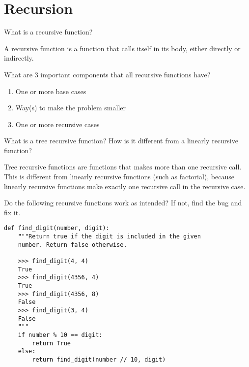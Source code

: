\documentclass{exam}
\begin{document}
\section{Recursion}
\begin{questions}


\begin{blocksection}

\question What is a recursive function?
\begin{solution}[0.5in]
A recursive function is a function that calls itself in its body, either
directly or indirectly.
\end{solution}

\question What are 3 important components that all recursive functions have?
\begin{solution}[1in]
\begin{enumerate}
    \item One or more base cases
    \item Way(s) to make the problem smaller
    \item One or more recursive cases
\end{enumerate}
\end{solution}


\question What is a tree recursive function? How is it different from a linearly
recursive function?
\begin{solution}[0.2in]
Tree recursive functions are functions that makes more than one recursive call.
This is different from linearly recursive functions (such as factorial), because
linearly recursive functions make exactly one recursive call in the recursive
case.
\end{solution}

\end{blocksection}

\begin{blocksection}

\question Do the following recursive functions work as intended? If not, find
the bug and fix it.

\begin{lstlisting}
def find_digit(number, digit):
    """Return true if the digit is included in the given
    number. Return false otherwise.

    >>> find_digit(4, 4)
    True
    >>> find_digit(4356, 4)
    True
    >>> find_digit(4356, 8)
    False
    >>> find_digit(3, 4)
    False
    """
    if number % 10 == digit:
        return True
    else:
        return find_digit(number // 10, digit)
\end{lstlisting}
\end{blocksection}


\end{questions}
\end{document}
